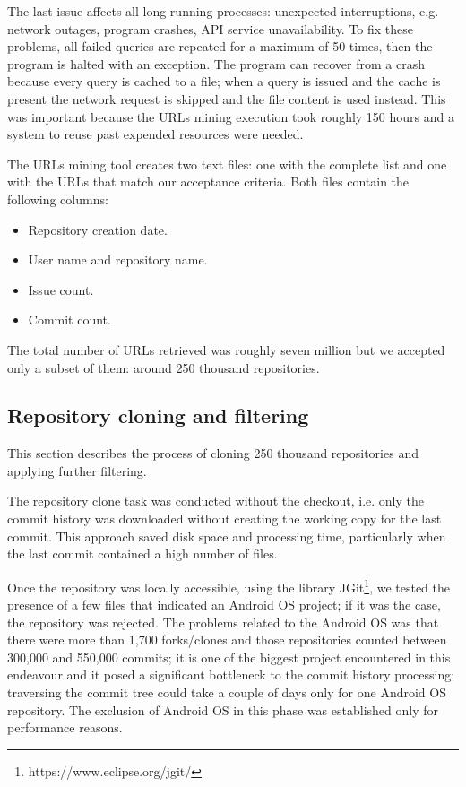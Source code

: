 The last issue affects all long-running processes: unexpected interruptions, e.g. network outages, program crashes, API service unavailability. To fix these problems, all failed queries are repeated for a maximum of 50 times, then the program is halted with an exception. 
The program can recover from a crash because every query is cached to a file; when a query is issued and the cache is present the network request is skipped and the file content is used instead. This was important because the URLs mining execution took roughly 150 hours and a system to reuse past expended resources were needed.

The URLs mining tool creates two text files: one with the complete list and one with the URLs that match our acceptance criteria. Both files contain the following columns:

\begin{itemize}
    \item Repository creation date.
    \item User name and repository name.
    \item Issue count.
    \item Commit count.
\end{itemize}

The total number of URLs retrieved was roughly seven million but we accepted only a subset of them: around 250 thousand repositories.






\subsection{Repository cloning and filtering}
This section describes the process of cloning 250 thousand repositories and applying further filtering. 

The repository clone task was conducted without the checkout, i.e. only the commit history was downloaded without creating the working copy for the last commit. This approach saved disk space and processing time, particularly when the last commit contained a high number of files. 

Once the repository was locally accessible, using the library JGit\footnote{https://www.eclipse.org/jgit/}, we tested the presence of a few files that indicated an Android OS project; if it was the case, the repository was rejected.
The problems related to the Android OS was that there were more than 1,700 forks/clones and those repositories counted between 300,000 and 550,000 commits; it is one of the biggest project encountered in this endeavour and it posed a significant bottleneck to the commit history processing: traversing the commit tree could take a couple of days only for one Android OS repository.
The exclusion of Android OS in this phase was established only for performance reasons.

